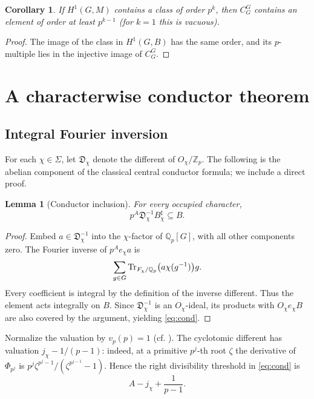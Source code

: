 \documentclass[11pt]{article}
\newtheorem{lemma}[theorem]{Lemma}
\newtheorem{corollary}[theorem]{Corollary}
\theoremstyle{definition}\newtheorem{definition}[theorem]{Definition}\newtheorem{example}[theorem]{Example}
\theoremstyle{remark}\newtheorem{remark}[theorem]{Remark}
\newcommand{\Zp}{\mathbb Z_p}\newcommand{\Qp}{\mathbb Q_p}\newcommand{\Fp}{\mathbb F_p}
\begin{document}
\begin{corollary}
If $H^1(G,M)$ contains a class of order $p^k$, then $C_G^G$ contains an element of order at least $p^{k-1}$ (for $k=1$ this is vacuous).
\end{corollary}
\begin{proof} The image of the class in $H^1(G,B)$ has the same order, and its $p$-multiple lies in the injective image of $C_G^G$.\end{proof}

\section{A characterwise conductor theorem}
\subsection{Integral Fourier inversion}
For each $\chi\in\Sigma$, let $\mathfrak D_\chi$ denote the different of $O_\chi/\Zp$. The following is the abelian component of the classical central conductor formula; we include a direct proof.
\begin{lemma}[Conductor inclusion]\label{lem:cond}
For every occupied character,
\begin{equation}\label{eq:cond}
 p^A\mathfrak D_\chi^{-1}B^\sharp_\chi\subseteq B.
\end{equation}
\end{lemma}
\begin{proof}
Embed $a\in\mathfrak D_\chi^{-1}$ into the $\chi$-factor of $\Qp[G]$, with all other components zero. The Fourier inverse of $p^Ae_\chi a$ is
\[
 \sum_{g\in G}\Tr_{F_\chi/\Qp}\bigl(a\chi(g^{-1})\bigr)g.
\]
Every coefficient is integral by the definition of the inverse different. Thus the element acts integrally on $B$. Since $\mathfrak D_\chi^{-1}$ is an $O_\chi$-ideal, its products with $O_\chi e_\chi B$ are also covered by the argument, yielding \eqref{eq:cond}.
\end{proof}
Normalize the valuation by $v_p(p)=1$ (cf. \cite{serre}). The cyclotomic different has valuation $j_\chi-1/(p-1)$: indeed, at a primitive $p^j$-th root $\zeta$ the derivative of $\Phi_{p^j}$ is $p^j\zeta^{p^j-1}/(\zeta^{p^{j-1}}-1)$. Hence the right divisibility threshold in \eqref{eq:cond} is
\begin{equation}\label{eq:threshold}
 A-j_\chi+\frac{1}{p-1}.
\end{equation}
\end{document}
